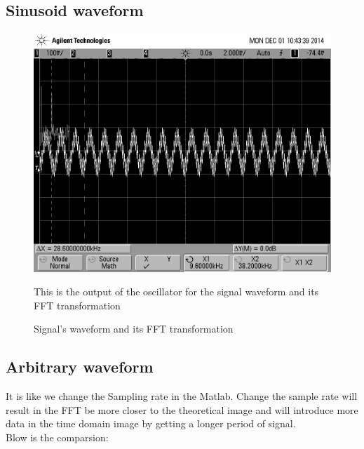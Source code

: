 \documentclass[11pt]{article}
\begin{document}
\subsection{Sinusoid waveform}
\FloatBarrier
\begin{figure}[!h]
\includegraphics[scale = 0.25]{elec_3_1.png}

\caption{Signal's waveform and its FFT transformation }

\begin{minipage}{0.75\textwidth}
{\footnotesize This is the output of the oscillator for the signal waveform and its FFT transformation}
\end{minipage}
\end{figure}
\FloatBarrier


\subsection{Arbitrary waveform}
It is like we change the Sampling rate in the Matlab. Change the sample rate will result in the FFT be more closer to the theoretical image and will introduce more data in the time domain image by getting a longer period of signal.\\

Blow is the comparsion:
\end{document}
